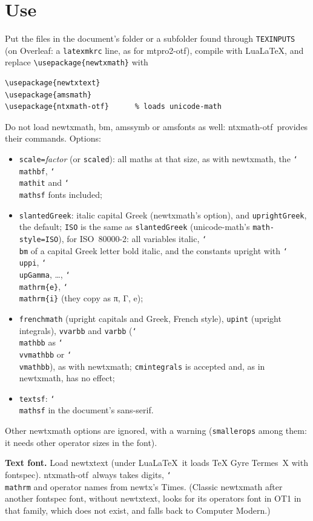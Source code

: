 \documentclass[11pt,a4paper]{article}
\newcommand\pkg{\textsf{ntxmath-otf}}
\newcommand\cs[1]{\texttt{\char`\\#1}}
\begin{document}
\section{Use}
Put the files in the document's folder or a subfolder found through \texttt{TEXINPUTS}
(on Overleaf: a \texttt{latexmkrc} line, as for \textsf{mtpro2-otf}), compile with
Lua\LaTeX, and replace \verb|\usepackage{newtxmath}| with
\begin{verbatim}
\usepackage{newtxtext}
\usepackage{amsmath}
\usepackage{ntxmath-otf}      % loads unicode-math
\end{verbatim}
Do not load \textsf{newtxmath}, \textsf{bm}, \textsf{amssymb} or \textsf{amsfonts} as
well: \pkg\ provides their commands. Options:
\begin{itemize}
\item \texttt{scale=}\textit{factor} (or \texttt{scaled}): all maths at that size, as with
  \textsf{newtxmath}, the \cs{mathbf}, \cs{mathit} and \cs{mathsf} fonts included;
\item \texttt{slantedGreek}: italic capital Greek (\textsf{newtxmath}'s option), and
  \texttt{uprightGreek}, the default; \texttt{ISO} is the same as \texttt{slantedGreek}
  (\textsf{unicode-math}'s \texttt{math-style=ISO}), for ISO~80000-2: all variables italic,
  \cs{bm} of a capital Greek letter bold italic, and the constants upright with
  \cs{uppi}, \cs{upGamma}, \ldots, \cs{mathrm\{e\}}, \cs{mathrm\{i\}} (they copy as π, Γ, e);
\item \texttt{frenchmath} (upright capitals and Greek, French style), \texttt{upint}
  (upright integrals), \texttt{vvarbb} and \texttt{varbb} (\cs{mathbb} as \cs{vvmathbb} or
  \cs{vmathbb}), as with \textsf{newtxmath}; \texttt{cmintegrals} is accepted and, as in
  \textsf{newtxmath}, has no effect;
\item \texttt{textsf}: \cs{mathsf} in the document's sans-serif.
\end{itemize}
Other \textsf{newtxmath} options are ignored, with a warning (\texttt{smallerops} among
them: it needs other operator sizes in the font).

\textbf{Text font.} Load \textsf{newtxtext} (under Lua\LaTeX\ it loads TeX Gyre Termes~X
with \textsf{fontspec}). \pkg\ always takes digits, \cs{mathrm} and operator names from
\textsf{newtx}'s Times. (Classic \textsf{newtxmath} after another \textsf{fontspec} font,
without \textsf{newtxtext}, looks for its operators font in OT1 in that family, which does not
exist, and falls back to Computer Modern.)
\end{document}
